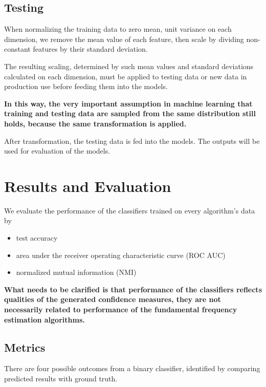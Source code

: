 \documentclass[11pt,a4paper]{report}
\begin{document}
\section{Testing}

When normalizing the training data to zero mean, unit variance on each dimension, we remove the mean value of each feature, then scale by dividing non-constant features by their standard deviation.

The resulting scaling, determined by such mean values and standard deviations calculated on each dimension, must be applied to testing data or new data in production use before feeding them into the models.

\bigskip

\textbf{In this way, the very important assumption in machine learning that training and testing data are sampled from the same distribution still holds, because the same transformation is applied.}

\bigskip

After transformation, the testing data is fed into the models.
The outputs will be used for evaluation of the models.

\chapter{Results and Evaluation}

We evaluate the performance of the classifiers trained on every algorithm's data by

\begin{itemize}
  \item test accuracy
  \item area under the receiver operating characteristic curve (ROC AUC)
  \item normalized mutual information (NMI)
\end{itemize}

\begin{mdframed}
\textbf{What needs to be clarified is that performance of the classifiers reflects qualities of the generated confidence measures, they are not necessarily related to performance of the fundamental frequency estimation algorithms.}
\end{mdframed}

\section{Metrics}

There are four possible outcomes from a binary classifier, identified by comparing predicted results with ground truth.
\end{document}
